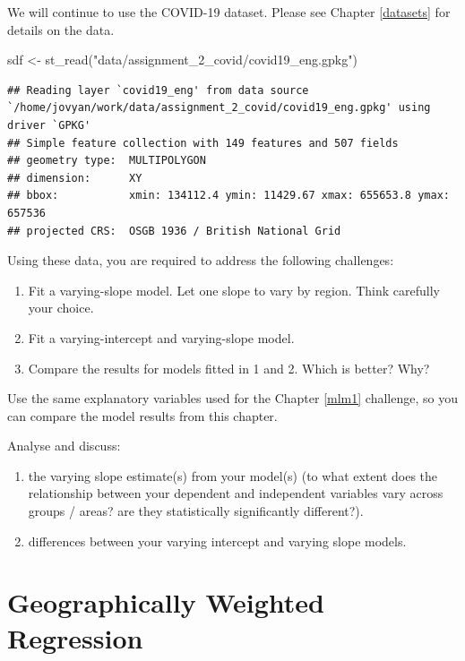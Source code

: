 \documentclass[
]{book}
\newenvironment{Shaded}{\begin{snugshade}}{\end{snugshade}}
\newcommand{\FunctionTok}[1]{\textcolor[rgb]{0.00,0.00,0.00}{#1}}
\newcommand{\NormalTok}[1]{#1}
\newcommand{\OtherTok}[1]{\textcolor[rgb]{0.56,0.35,0.01}{#1}}
\newcommand{\StringTok}[1]{\textcolor[rgb]{0.31,0.60,0.02}{#1}}
\providecommand{\tightlist}{%
  \setlength{\itemsep}{0pt}\setlength{\parskip}{0pt}}
\begin{document}
We will continue to use the COVID-19 dataset. Please see Chapter \ref{datasets} for details on the data.

\begin{Shaded}
\begin{Highlighting}[]
\NormalTok{sdf }\OtherTok{\textless{}{-}} \FunctionTok{st\_read}\NormalTok{(}\StringTok{"data/assignment\_2\_covid/covid19\_eng.gpkg"}\NormalTok{)}
\end{Highlighting}
\end{Shaded}

\begin{verbatim}
## Reading layer `covid19_eng' from data source `/home/jovyan/work/data/assignment_2_covid/covid19_eng.gpkg' using driver `GPKG'
## Simple feature collection with 149 features and 507 fields
## geometry type:  MULTIPOLYGON
## dimension:      XY
## bbox:           xmin: 134112.4 ymin: 11429.67 xmax: 655653.8 ymax: 657536
## projected CRS:  OSGB 1936 / British National Grid
\end{verbatim}

Using these data, you are required to address the following challenges:

\begin{enumerate}
\def\labelenumi{\arabic{enumi}.}
\item
  Fit a varying-slope model. Let one slope to vary by region. Think carefully your choice.
\item
  Fit a varying-intercept and varying-slope model.
\item
  Compare the results for models fitted in 1 and 2. Which is better? Why?
\end{enumerate}

Use the same explanatory variables used for the Chapter \ref{mlm1} challenge, so you can compare the model results from this chapter.

Analyse and discuss:

\begin{enumerate}
\def\labelenumi{\arabic{enumi}.}
\tightlist
\item
  the varying slope estimate(s) from your model(s) (to what extent does the relationship between your
  dependent and independent variables vary across groups / areas? are they statistically significantly
  different?).
\item
  differences between your varying intercept and varying slope models.
\end{enumerate}

\hypertarget{gwr}{%
\chapter{Geographically Weighted Regression}\label{gwr}}
\end{document}
